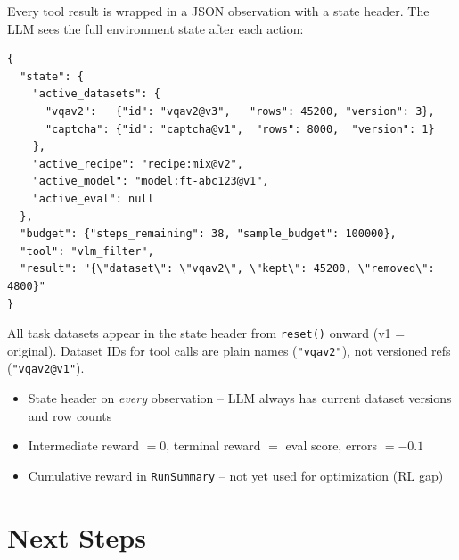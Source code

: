 Every tool result is wrapped in a JSON observation with a state header. The LLM sees the full environment state after each action:

\begin{verbatim}
{
  "state": {
    "active_datasets": {
      "vqav2":   {"id": "vqav2@v3",   "rows": 45200, "version": 3},
      "captcha": {"id": "captcha@v1",  "rows": 8000,  "version": 1}
    },
    "active_recipe": "recipe:mix@v2",
    "active_model": "model:ft-abc123@v1",
    "active_eval": null
  },
  "budget": {"steps_remaining": 38, "sample_budget": 100000},
  "tool": "vlm_filter",
  "result": "{\"dataset\": \"vqav2\", \"kept\": 45200, \"removed\": 4800}"
}
\end{verbatim}

\noindent All task datasets appear in the state header from \texttt{reset()} onward (v1 = original).
Dataset IDs for tool calls are plain names (\texttt{"vqav2"}), not versioned refs (\texttt{"vqav2@v1"}).

\begin{itemize}
    \item State header on \emph{every} observation -- LLM always has current dataset versions and row counts
    \item Intermediate reward $= 0$, terminal reward $= $ eval score, errors $= -0.1$
    \item Cumulative reward in \texttt{RunSummary} -- not yet used for optimization (RL gap)
\end{itemize}



\section{Next Steps}

